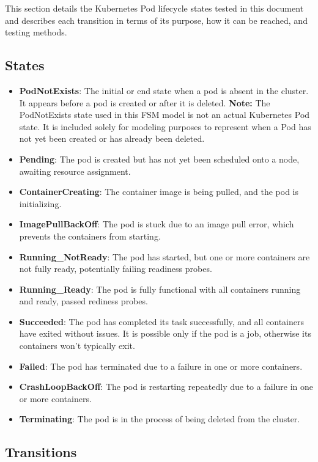 \documentclass[main.tex]{subfiles}
\begin{document}
This section details the Kubernetes Pod lifecycle states tested in this document and describes each transition in terms of its purpose, how it can be reached, and testing methods.

\subsection{States}
\begin{itemize}
    \item \textbf{PodNotExists}: The initial or end state when a pod is absent in the cluster. It appears before a pod is created or after it is deleted. 
    \textbf{Note:} The PodNotExists state used in this FSM model is not an actual Kubernetes Pod state. It is included solely for modeling purposes to represent when a Pod has not yet been created or has already been deleted.
    \item \textbf{Pending}: The pod is created but has not yet been scheduled onto a node, awaiting resource assignment.
    \item \textbf{ContainerCreating}: The container image is being pulled, and the pod is initializing.
    \item \textbf{ImagePullBackOff}: The pod is stuck due to an image pull error, which prevents the containers from starting.
    \item \textbf{Running\_NotReady}: The pod has started, but one or more containers are not fully ready, potentially failing readiness probes.
    \item \textbf{Running\_Ready}: The pod is fully functional with all containers running and ready, passed rediness probes.
    \item \textbf{Succeeded}: The pod has completed its task successfully, and all containers have exited without issues. It is possible only if the pod is a job, otherwise its containers won't typically exit.
    \item \textbf{Failed}: The pod has terminated due to a failure in one or more containers. 
    \item \textbf{CrashLoopBackOff}: The pod is restarting repeatedly due to a failure in one or more containers.
    \item \textbf{Terminating}: The pod is in the process of being deleted from the cluster.
\end{itemize}

\subsection{Transitions}
\end{document}
